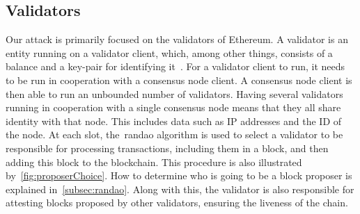\subsection{Validators}\label{subsec:validator}
Our attack is primarily focused on the validators of Ethereum.
A validator is an entity running on a validator client,
which, among other things, consists of a balance and a key-pair for identifying it~\cite{Staking}.
For a validator client to run, it needs to be run in cooperation with a consensus node client.
A consensus node client is then able to run an unbounded number of validators.
Having several validators running in cooperation with a single consensus node means that they all share identity with that node.
This includes data such as IP addresses and the ID of the node.
At each slot, the~\gls{randao} algorithm is used to select a validator to be responsible for processing transactions,
including them in a block,
and then adding this block to the blockchain.
This procedure is also illustrated by~\autoref{fig:proposerChoice}.
How to determine who is going to be a block proposer is explained in~\autoref{subsec:randao}.
Along with this, the validator is also responsible for attesting blocks proposed by other validators,
ensuring the liveness of the chain.


